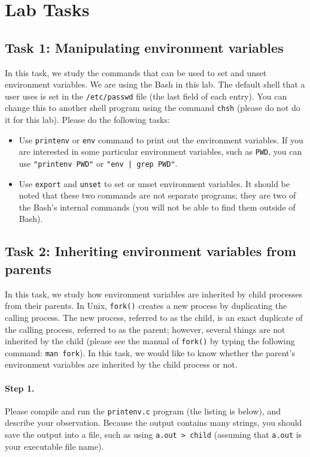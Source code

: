 \section{Lab Tasks}

\subsection{Task 1: Manipulating environment variables}

In this task, we study the commands that can be used to set and unset
environment variables. We are using the Bash in this lab. The default
shell that a user uses is set in  the {\tt /etc/passwd} file (the last
field of each entry). You can change this to another shell program using
the command {\tt chsh} (please do not do it for this lab). Please 
do the following tasks:

\begin{itemize}
\item Use {\tt printenv} or {\tt env} command to print out the 
environment variables. If you are interested in some particular 
environment variables, such as {\tt PWD}, you can use {\tt "printenv PWD"}
or {\tt "env | grep PWD"}. 


\item Use {\tt export} and {\tt unset} to set or unset environment
variables. It should be noted that 
these two commands are not separate programs; they are two of 
the Bash's internal commands (you will not be able to find them
outside of Bash).

\end{itemize}


\subsection{Task 2: Inheriting environment variables from parents}

In this task, we study how environment variables are inherited by 
child processes from their parents. In Unix,
{\tt fork()} creates a new process by duplicating the calling process.
The new process, referred to as the child, is an exact duplicate of the calling 
process, referred to as the parent; however, several things 
are not inherited by the child (please see the manual of {\tt fork()} by
typing the following command: {\tt man fork}). In this task,
we would like to know whether the parent's environment variables
are inherited by the child process or not.


\paragraph{Step 1.} Please compile and run the {\tt printenv.c}
program (the listing is below),  and describe your observation. Because the output 
contains many strings, you should save the output into a file, such as
using {\tt a.out > child} (assuming that {\tt a.out} is your 
executable file name).


